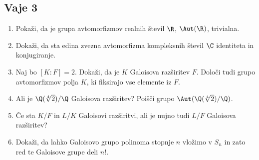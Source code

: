 \subsection*{Vaje 3}

\begin{enumerate}
    \item Pokaži, da je grupa avtomorfizmov realnih števil $\R$, $\Aut(\R)$, trivialna.
    \item Dokaži, da sta edina zvezna avtomorfizma kompleksnih števil $\C$ identiteta in konjugiranje.
    \item Naj bo $[K : F] = 2$. Dokaži, da je $K$ Galoisova razširitev $F$. 
    Določi tudi grupo avtomorfizmov polja $K$, ki fiksirajo vse elemente iz $F$.
    \item Ali je $\Q(\sqrt[4]{2})/\Q$ Galoisova razširitev? 
    Poišči grupo $\Aut(\Q(\sqrt[4]{2})/\Q)$.
    \item Če sta $K/F$ in $L/K$ Galoisovi razširitvi, ali je nujno tudi $L/F$ Galoisova razširitev?
    \item Dokaži, da lahko Galoisovo grupo polinoma stopnje $n$ vložimo v $S_n$ in 
    zato red te Galoisove grupe deli $n!$.
\end{enumerate}


%

%
